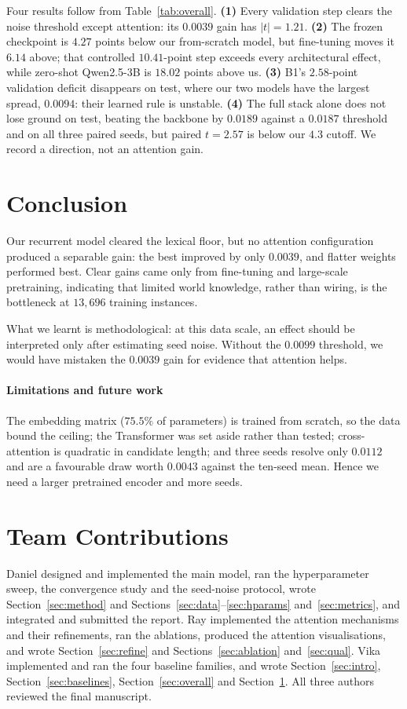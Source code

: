 \documentclass[11pt]{article}
\begin{document}
Four results follow from Table~\ref{tab:overall}. \textbf{(1)} Every validation
step clears the noise threshold except attention: its $0.0039$ gain has
$|t|=1.21$. \textbf{(2)} The frozen checkpoint is $4.27$ points below our
from-scratch model, but fine-tuning moves it $6.14$ above; that controlled
$10.41$-point step exceeds every architectural effect, while zero-shot
Qwen2.5-3B is $18.02$ points above us. \textbf{(3)} B1's $2.58$-point
validation deficit disappears on test, where our two models have the largest
spread, $0.0094$: their learned rule is unstable. \textbf{(4)} The full stack
alone does not lose ground on test, beating the backbone by $0.0189$ against a
$0.0187$ threshold and on all three paired seeds, but paired $t=2.57$ is below
our $4.3$ cutoff. We record a direction, not an attention gain.

\section{Conclusion}
\label{sec:conclusion}

Our recurrent model cleared the lexical floor, but no attention configuration
produced a separable gain: the best improved by only $0.0039$, and flatter
weights performed best. Clear gains came only from fine-tuning and large-scale
pretraining, indicating that limited world knowledge, rather than wiring, is
the bottleneck at $13{,}696$ training instances.

What we learnt is methodological: at this data scale, an effect should be
interpreted only after estimating seed noise. Without the $0.0099$ threshold,
we would have mistaken the $0.0039$ gain for evidence that attention helps.

\paragraph{Limitations and future work}
The embedding matrix ($75.5\%$ of parameters) is trained from scratch, so the
data bound the ceiling; the Transformer was set aside rather than tested;
cross-attention is quadratic in candidate length; and three seeds resolve only
$0.0112$ and are a favourable draw worth $0.0043$ against the ten-seed mean.
Hence we need a larger pretrained encoder and more seeds.

\clearpage
\section*{Team Contributions}

Daniel designed and implemented the main model, ran the hyperparameter sweep,
the convergence study and the seed-noise protocol, wrote Section~\ref{sec:method}
and Sections~\ref{sec:data}--\ref{sec:hparams} and~\ref{sec:metrics}, and
integrated and submitted the report. Ray implemented the attention mechanisms
and their refinements, ran the ablations, produced the attention
visualisations, and wrote Section~\ref{sec:refine} and
Sections~\ref{sec:ablation} and~\ref{sec:qual}. Vika implemented and ran the
four baseline families, and wrote Section~\ref{sec:intro},
Section~\ref{sec:baselines}, Section~\ref{sec:overall} and
Section~\ref{sec:conclusion}. All three authors reviewed the final manuscript.


\end{document}
